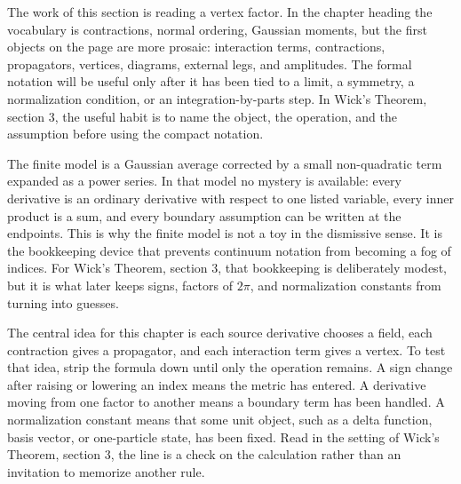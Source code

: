 











The work of this section is reading a vertex factor.  In the chapter heading the vocabulary is contractions, normal ordering, Gaussian moments, but the first objects on the page are more prosaic: interaction terms, contractions, propagators, vertices, diagrams, external legs, and amplitudes.  The formal notation will be useful only after it has been tied to a limit, a symmetry, a normalization condition, or an integration-by-parts step.  In Wick's Theorem, section 3, the useful habit is to name the object, the operation, and the assumption before using the compact notation.

The finite model is a Gaussian average corrected by a small non-quadratic term expanded as a power series.  In that model no mystery is available: every derivative is an ordinary derivative with respect to one listed variable, every inner product is a sum, and every boundary assumption can be written at the endpoints.  This is why the finite model is not a toy in the dismissive sense.  It is the bookkeeping device that prevents continuum notation from becoming a fog of indices.  For Wick's Theorem, section 3, that bookkeeping is deliberately modest, but it is what later keeps signs, factors of \(2\pi\), and normalization constants from turning into guesses.

The central idea for this chapter is each source derivative chooses a field, each contraction gives a propagator, and each interaction term gives a vertex.  To test that idea, strip the formula down until only the operation remains.  A sign change after raising or lowering an index means the metric has entered.  A derivative moving from one factor to another means a boundary term has been handled.  A normalization constant means that some unit object, such as a delta function, basis vector, or one-particle state, has been fixed.  Read in the setting of Wick's Theorem, section 3, the line is a check on the calculation rather than an invitation to memorize another rule.

